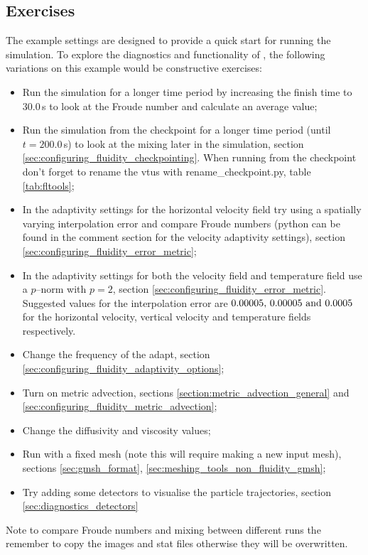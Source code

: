\subsection{Exercises}
\label{sec:le_exercises}
The example settings are designed to provide a quick start for running the simulation. To explore the diagnostics and functionality of \fluidity, the following variations on this example would be constructive exercises:
\begin{itemize}
\item Run the simulation for a longer time period by increasing the finish time to $30.0\,$s to look at the Froude number and calculate an average value;
\item Run the simulation from the checkpoint for a longer time period (until $t=200.0\,$s) to look at the mixing later in the simulation, section \ref{sec:configuring_fluidity_checkpointing}. When running from the checkpoint don't forget to rename the vtus with rename\_checkpoint.py, table \ref{tab:fltools};
\item In the adaptivity settings for the horizontal velocity field try using a spatially varying interpolation error and compare Froude numbers (python can be found in the comment section for the velocity adaptivity settings), section \ref{sec:configuring_fluidity_error_metric};
\item In the adaptivity settings for both the velocity field and temperature field use a $p$--norm with \mbox{$p=2$}, section \ref{sec:configuring_fluidity_error_metric}. Suggested values for the interpolation error are $0.00005, \, 0.00005 \,\, {\rm and} \,\, 0.0005$ for the horizontal velocity, vertical velocity and temperature fields respectively. 
\item Change the frequency of the adapt, section \ref{sec:configuring_fluidity_adaptivity_options};
\item Turn on metric advection, sections \ref{section:metric_advection_general} and \ref{sec:configuring_fluidity_metric_advection};
\item Change the diffusivity and viscosity values;
\item Run with a fixed mesh (note this will require making a new input mesh), sections \ref{sec:gmsh_format}, \ref{sec:meshing_tools_non_fluidity_gmsh};
\item Try adding some detectors to visualise the particle trajectories, section \ref{sec:diagnostics_detectors} %
\end{itemize}
Note to compare Froude numbers and mixing between different runs the remember to copy the images and stat files otherwise they will be overwritten.

